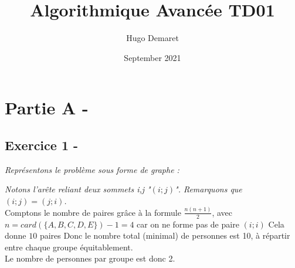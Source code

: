 \documentclass{article}
\title{Algorithmique Avancée TD01}
\author{Hugo Demaret}
\date{September 2021}
\begin{document}
\maketitle
\section*{Partie A -}
\subsection*{Exercice 1 -}
\textit{Représentons le problème sous forme de graphe :}
	\begin{center}
	\end{center}
	\textit{Notons l'arête reliant deux sommets i,j "$(i;j)$". Remarquons que $(i;j) = (j;i)$.}\\
	\linebreak
	\textsf{Comptons le nombre de paires grâce à la formule $\frac{n(n+1)}{2} $, avec $n = card(\{A,B,C,D,E\}) -1 = 4 $ car on ne forme pas de paire $(i;i)$}
	\linebreak
	\textsf{Cela donne $ 10$ paires}
	\textsf{Donc le nombre total (minimal) de personnes est 10, à répartir entre chaque groupe équitablement.}\\
	\textsf{Le nombre de personnes par groupe est donc 2.}
\end{document}
